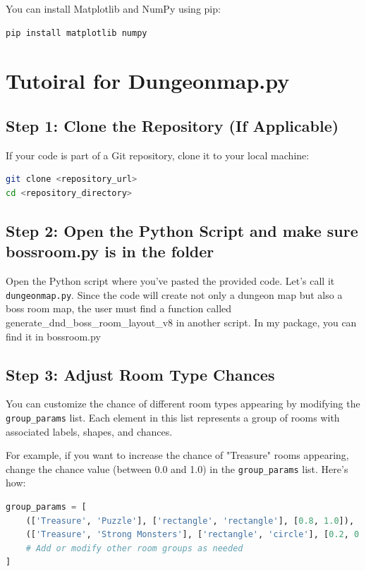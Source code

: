 \documentclass[10pt,twocolumn]{article}
\begin{document}
You can install Matplotlib and NumPy using pip:

\begin{lstlisting}[language=bash]
pip install matplotlib numpy
\end{lstlisting}
\section{Tutoiral for Dungeonmap.py}
\subsection{Step 1: Clone the Repository (If Applicable)}

If your code is part of a Git repository, clone it to your local machine:

\begin{lstlisting}[language=bash]
git clone <repository_url>
cd <repository_directory>
\end{lstlisting}

\subsection{Step 2: Open the Python Script and make sure bossroom.py is in the folder}

Open the Python script where you've pasted the provided code. Let's call it \texttt{dungeonmap.py}. Since the code will create not only a dungeon map but also a boss room map, the user must find a function called generate\_dnd\_boss\_room\_layout\_v8 in another script. In my package, you can find it in bossroom.py

\subsection{Step 3: Adjust Room Type Chances}

You can customize the chance of different room types appearing by modifying the \texttt{group\_params} list. Each element in this list represents a group of rooms with associated labels, shapes, and chances.

For example, if you want to increase the chance of "Treasure" rooms appearing, change the chance value (between 0.0 and 1.0) in the \texttt{group\_params} list. Here's how:

\begin{lstlisting}[language=Python]
group_params = [
    (['Treasure', 'Puzzle'], ['rectangle', 'rectangle'], [0.8, 1.0]),  # Increase chance for 'Treasure'
    (['Treasure', 'Strong Monsters'], ['rectangle', 'circle'], [0.2, 0.6]),
    # Add or modify other room groups as needed
]
\end{lstlisting}
\end{document}
